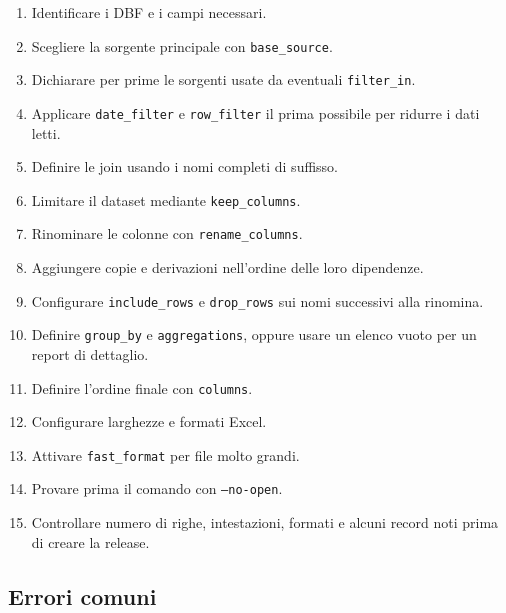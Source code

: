 \begin{enumerate}
  \item Identificare i DBF e i campi necessari.
  \item Scegliere la sorgente principale con \texttt{base\_source}.
  \item Dichiarare per prime le sorgenti usate da eventuali
        \texttt{filter\_in}.
  \item Applicare \texttt{date\_filter} e \texttt{row\_filter} il prima
        possibile per ridurre i dati letti.
  \item Definire le join usando i nomi completi di suffisso.
  \item Limitare il dataset mediante \texttt{keep\_columns}.
  \item Rinominare le colonne con \texttt{rename\_columns}.
  \item Aggiungere copie e derivazioni nell'ordine delle loro dipendenze.
  \item Configurare \texttt{include\_rows} e \texttt{drop\_rows} sui nomi
        successivi alla rinomina.
  \item Definire \texttt{group\_by} e \texttt{aggregations}, oppure usare un
        elenco vuoto per un report di dettaglio.
  \item Definire l'ordine finale con \texttt{columns}.
  \item Configurare larghezze e formati Excel.
  \item Attivare \texttt{fast\_format} per file molto grandi.
  \item Provare prima il comando con \texttt{--no-open}.
  \item Controllare numero di righe, intestazioni, formati e alcuni record
        noti prima di creare la release.
\end{enumerate}

\subsection{Errori comuni}

